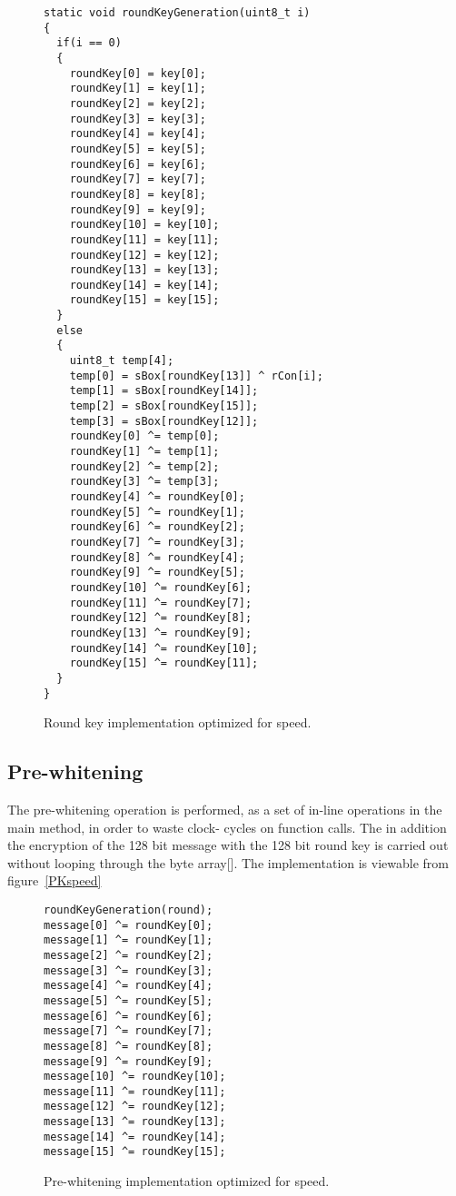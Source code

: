 \documentclass[Report.tex]{subfiles}
\begin{document}
\begin{figure}[h]
\begin{lstlisting}[basicstyle=\tiny]
static void roundKeyGeneration(uint8_t i)
{
  if(i == 0)
  {
    roundKey[0] = key[0];
    roundKey[1] = key[1];
    roundKey[2] = key[2];
    roundKey[3] = key[3];
    roundKey[4] = key[4];
    roundKey[5] = key[5];
    roundKey[6] = key[6];
    roundKey[7] = key[7];
    roundKey[8] = key[8];
    roundKey[9] = key[9];
    roundKey[10] = key[10];
    roundKey[11] = key[11];
    roundKey[12] = key[12];
    roundKey[13] = key[13];
    roundKey[14] = key[14];
    roundKey[15] = key[15];
  }
  else
  {
    uint8_t temp[4];
    temp[0] = sBox[roundKey[13]] ^ rCon[i];
    temp[1] = sBox[roundKey[14]];
    temp[2] = sBox[roundKey[15]];
    temp[3] = sBox[roundKey[12]];
    roundKey[0] ^= temp[0];
    roundKey[1] ^= temp[1];
    roundKey[2] ^= temp[2];
    roundKey[3] ^= temp[3];
    roundKey[4] ^= roundKey[0];
    roundKey[5] ^= roundKey[1];
    roundKey[6] ^= roundKey[2];
    roundKey[7] ^= roundKey[3];
    roundKey[8] ^= roundKey[4];
    roundKey[9] ^= roundKey[5];
    roundKey[10] ^= roundKey[6];
    roundKey[11] ^= roundKey[7];
    roundKey[12] ^= roundKey[8];
    roundKey[13] ^= roundKey[9];
    roundKey[14] ^= roundKey[10];
    roundKey[15] ^= roundKey[11];
  }
}
\end{lstlisting}
\caption{\label{RKspeed} Round key implementation optimized for speed.}
\end{figure}

\subsection{Pre-whitening}
The pre-whitening operation is performed,
as a set of in-line operations in the main method, in order to waste clock-
cycles on function calls. The in addition the encryption of 
the 128 bit message with the 128 bit round key is carried out
without looping through the byte array[]. The implementation is 
viewable from figure~\ref{PKspeed} 

\begin{figure}[h]
\begin{lstlisting}[basicstyle=\tiny]
roundKeyGeneration(round);
message[0] ^= roundKey[0];
message[1] ^= roundKey[1];
message[2] ^= roundKey[2];
message[3] ^= roundKey[3];
message[4] ^= roundKey[4];
message[5] ^= roundKey[5];
message[6] ^= roundKey[6];
message[7] ^= roundKey[7];
message[8] ^= roundKey[8];
message[9] ^= roundKey[9];
message[10] ^= roundKey[10];
message[11] ^= roundKey[11];
message[12] ^= roundKey[12];
message[13] ^= roundKey[13];
message[14] ^= roundKey[14];
message[15] ^= roundKey[15];
\end{lstlisting}
\caption{\label{RKspeed} Pre-whitening implementation optimized for speed.}
\end{figure}
\end{document}
